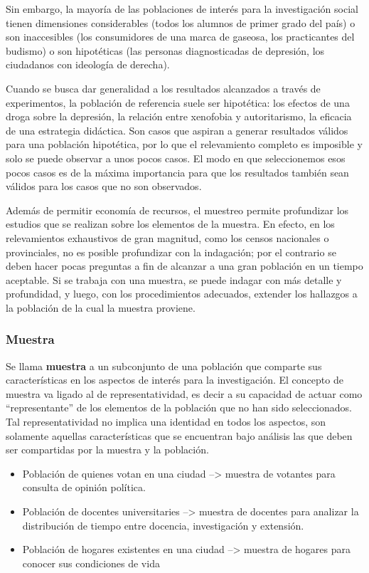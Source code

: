 \documentclass[]{article}
\providecommand{\tightlist}{%
  \setlength{\itemsep}{0pt}\setlength{\parskip}{0pt}}
\begin{document}
Sin embargo, la mayoría de las poblaciones de interés para la
investigación social tienen dimensiones considerables (todos los alumnos de primer grado del país) o son inaccesibles (los consumidores de una marca de gaseosa, los practicantes del budismo) o son hipotéticas (las personas diagnosticadas de depresión, los ciudadanos con ideología de derecha).

Cuando se busca dar generalidad a los resultados alcanzados a través de experimentos, la población de referencia suele ser hipotética: los
efectos de una droga sobre la depresión, la relación entre xenofobia y autoritarismo, la eficacia de una estrategia didáctica. Son casos que aspiran a generar
resultados válidos para una población hipotética, por lo que el
relevamiento completo es imposible y solo se puede observar a unos pocos
casos. El modo en que seleccionemos esos pocos casos es de la máxima
importancia para que los resultados también sean válidos para los casos
que no son observados.

Además de permitir economía de recursos, el muestreo permite profundizar
los estudios que se realizan sobre los elementos de la muestra. En
efecto, en los relevamientos exhaustivos de gran magnitud, como los
censos nacionales o provinciales, no es posible profundizar con la
indagación; por el contrario se deben hacer pocas preguntas a fin de
alcanzar a una gran población en un tiempo aceptable. Si se trabaja con
una muestra, se puede indagar con más detalle y profundidad, y luego,
con los procedimientos adecuados, extender los hallazgos a la población
de la cual la muestra proviene.

\hypertarget{muestra}{%
\subsubsection{Muestra}\label{muestra}}

Se llama \textbf{muestra} a un subconjunto de una población que comparte sus
características en los aspectos de interés para la investigación. El
concepto de muestra va ligado al de representatividad, es decir a su
capacidad de actuar como ``representante'' de los elementos de la
población que no han sido seleccionados. Tal representatividad no
implica una identidad en todos los aspectos, son solamente aquellas
características que se encuentran bajo análisis las que deben ser
compartidas por la muestra y la población.

\begin{itemize}
\tightlist
\item
  Población de quienes votan en una ciudad --\textgreater{} muestra de votantes para consulta de opinión política.
\item
  Población de docentes universitaries --\textgreater{} muestra de docentes para analizar la distribución de tiempo entre docencia, investigación y extensión.
\item
  Población de hogares existentes en una ciudad --\textgreater{} muestra de hogares para conocer sus condiciones de vida
\end{itemize}
\end{document}
